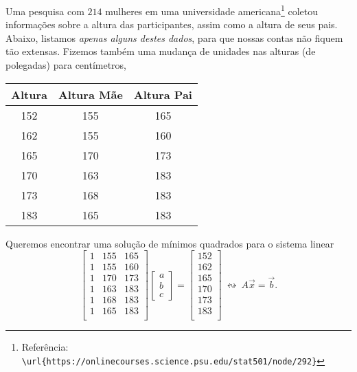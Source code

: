 \documentclass[../livro.tex]{subfiles}  %
\begin{document}
\begin{example}
  Uma pesquisa com $214$ mulheres em uma universidade americana\footnote{Referência: \verb"\url{https://onlinecourses.science.psu.edu/stat501/node/292}"} coletou informações sobre a altura das participantes, assim como a altura de seus pais. Abaixo, listamos \textit{apenas alguns destes dados}, para que nossas contas não fiquem tão extensas. Fizemos também uma mudança de unidades nas alturas (de polegadas) para centímetros,
  \begin{center}
    \begin{tabular}{|c|c|c|}
      \hline
      Altura & Altura Mãe & Altura Pai \\ \hline
      152 & 155 & 165 \\
      162 & 155 & 160 \\
      165 & 170 & 173 \\
      170 & 163 & 183 \\
      173 & 168 & 183 \\
      183 & 165 & 183 \\
      \hline
    \end{tabular}
  \end{center} Queremos encontrar uma solução de mínimos quadrados para o sistema linear
  \begin{equation}
  \begin{bmatrix}
    1 & 155 & 165 \\
    1 & 155 & 160 \\
    1 & 170 & 173 \\
    1 & 163 & 183 \\
    1 & 168 & 183 \\
    1 & 165 & 183 \\
  \end{bmatrix}
  \begin{bmatrix}
    a \\ b \\ c
  \end{bmatrix} =
  \begin{bmatrix}
    152  \\
    162  \\
    165  \\
    170  \\
    173  \\
    183  \\
  \end{bmatrix} \ \leftrightsquigarrow \ A \vec{x} = \vec{b}.

\end{equation}
\end{example}
\end{document}

